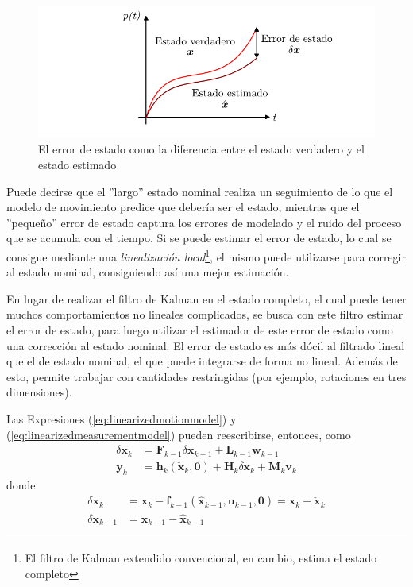 \begin{figure}[!h]
    \centering
    \includegraphics[width=\textwidth]{Img/ErrorState.png}
    \caption{El error de estado como la diferencia entre el estado verdadero y el estado estimado}
    \label{fig:errorstate}
\end{figure}

Puede decirse que el ''largo'' estado nominal realiza un seguimiento de lo que el modelo de movimiento predice que debería ser el estado, mientras que el ''pequeño'' error de estado captura los errores de modelado y el ruido del proceso que se acumula con el tiempo. Si se puede estimar el error de estado, lo cual se consigue mediante una \textit{linealización local}\footnote{El filtro de Kalman extendido convencional, en cambio, estima el estado completo}, el mismo puede utilizarse para corregir al estado nominal, consiguiendo así una mejor estimación.

En lugar de realizar el filtro de Kalman en el estado completo, el cual puede tener muchos comportamientos no lineales complicados, se busca con este filtro estimar el error de estado, para luego utilizar el estimador de este error de estado como una corrección al estado nominal. El error de estado es más dócil al filtrado lineal que el de estado nominal, el que puede integrarse de forma no lineal. Además de esto, permite trabajar con cantidades restringidas (por ejemplo, rotaciones en tres dimensiones).

Las Expresiones (\ref{eq:linearizedmotionmodel}) y (\ref{eq:linearizedmeasurementmodel}) pueden reescribirse, entonces, como
\begin{align}
    \delta \bm{x}_k &= \bm{F}_{k-1}\delta\bm{x}_{k-1} + \bm{L}_{k-1}\bm{w}_{k-1} \\
    \bm{y}_k &= \bm{h}_k(\check{\bm{x}}_k,\bm{0}) + \bm{H}_k\delta\bm{x}_k + \bm{M}_k\bm{v}_k 
\end{align}
donde
\begin{align}
    \delta \bm{x}_k &= \bm{x}_k - \bm{f}_{k-1}(\hat{\bm{x}}_{k-1},\bm{u}_{k-1},\bm{0}) = \bm{x}_k - \check{\bm{x}}_k \\
    \delta\bm{x}_{k-1} &= \bm{x}_{k-1} - \hat{\bm{x}}_{k-1}
\end{align}

